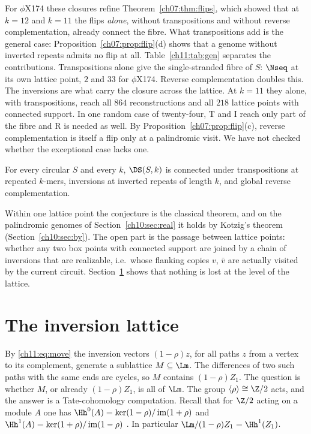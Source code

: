 For $\phi$X174 these closures refine Theorem~\ref{ch07:thm:flips}, which showed that at $k=12$ and
$k=11$ the flips \emph{alone}, without transpositions and without reverse complementation, already
connect the fibre. What transpositions add is the general case:
Proposition~\ref{ch07:prop:flip}(d) shows that a genome without inverted repeats admits no flip at all.
Table~\ref{ch11:tab:gen} separates the contributions. Transpositions alone give the single-stranded fibre of
$S$: $\Nseq$ at its own lattice point, $2$ and $33$ for $\phi$X174. Reverse complementation doubles
this. The inversions are what carry the closure across the lattice. At $k=11$ they alone, with
transpositions, reach all $864$ reconstructions and all $218$ lattice points with connected support. In
one random case of twenty-four, T and I reach only part of the fibre and R is needed as well. By
Proposition~\ref{ch07:prop:flip}(c), reverse complementation is itself a flip only at a palindromic visit. We have not
checked whether the exceptional case lacks one.

\begin{conjecture}\label{ch11:conj:gen}
For every circular $S$ and every $k$, $\DS(S,k)$ is connected under transpositions at repeated
$k$-mers, inversions at inverted repeats of length $k$, and global reverse complementation.
\end{conjecture}

Within one lattice point the conjecture is the classical theorem, and on the palindromic genomes of
Section~\ref{ch10:sec:real} it holds by Kotzig's theorem (Section~\ref{ch10:sec:by}). The open part is the passage
between lattice points: whether any two box points with connected support are joined by a chain of
inversions that are realizable, i.e.\ whose flanking copies $v$, $\bar v$ are actually visited by the
current circuit. Section~\ref{ch11:sec:lattice} shows that nothing is lost at the level of the lattice.

\section{The inversion lattice}\label{ch11:sec:lattice}

By \eqref{ch11:eq:move} the inversion vectors $(1-\rho)z$, for all paths $z$ from a vertex to its complement,
generate a sublattice $M\subseteq\Lm$. The differences of two such paths with the same ends are cycles,
so $M$ contains $(1-\rho)Z_1$. The question is whether $M$, or already $(1-\rho)Z_1$, is all of $\Lm$.
The group $\langle\rho\rangle\cong\Z/2$ acts, and the answer is a Tate-cohomology computation. Recall
that for $\Z/2$ acting on a module $A$ one has
$\Hh^0(A)=\ker(1-\rho)/\operatorname{im}(1+\rho)$ and $\Hh^1(A)=\ker(1+\rho)/\operatorname{im}(1-\rho)$
\cite{Bro82}. In particular $\Lm/(1-\rho)Z_1=\Hh^1(Z_1)$.

